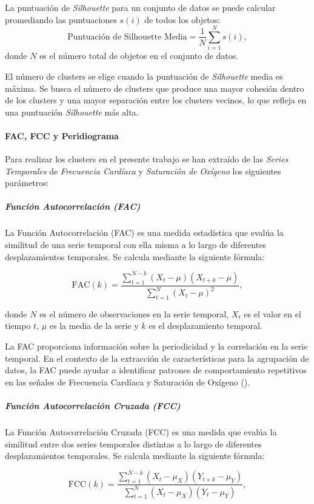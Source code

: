 La puntuación de \textit{Silhouette} para un conjunto de datos se puede calcular promediando las puntuaciones $s(i)$ de todos los objetos:
\[ \text{Puntuación de Silhouette Media} = \frac{1}{N} \sum_{i=1}^{N} s(i), \]
donde \(N\) es el número total de objetos en el conjunto de datos.

El número de clusters se elige cuando la puntuación de \textit{Silhouette} media es máxima. Se busca el número de clusters que produce una mayor cohesión dentro de los clusters y una mayor
separación entre los clusters vecinos, lo que refleja en una puntuación \textit{Silhouette} más alta.

\paragraph{FAC, FCC y Peridiograma}\label{sec:fac-fcc-peridiograma}

Para realizar los clusters en el presente trabajo se han extraído de las \textit{Series Temporales} de \textit{Frecuencia Cardíaca} y \textit{Saturación de Oxígeno} los siguientes parámetros:

\subparagraph{Función Autocorrelación (FAC)}

La Función Autocorrelación (FAC) es una medida estadística que evalúa la similitud de una serie temporal con ella misma a lo largo de diferentes desplazamientos temporales. Se calcula mediante la siguiente fórmula:

\[
\text{FAC}(k) = \frac{\sum_{t=1}^{N-k}(X_t - \mu)(X_{t+k} - \mu)}{\sum_{t=1}^{N}(X_t - \mu)^2}
,\]

donde $N$ es el número de observaciones en la serie temporal, $X_t$ es el valor en el tiempo $t$, $\mu$ es la media de la serie y $k$ es el desplazamiento temporal.

La FAC proporciona información sobre la periodicidad y la correlación en la serie temporal. En el contexto de la extracción de características para la agrupación de datos, la FAC puede ayudar a identificar patrones de comportamiento repetitivos en las señales de Frecuencia Cardíaca y Saturación de Oxígeno (\cite{shumway2017chapter1}).

\subparagraph{Función Autocorrelación Cruzada (FCC)}

La Función Autocorrelación Cruzada (FCC) es una medida que evalúa la similitud entre dos series temporales distintas a lo largo de diferentes desplazamientos temporales. Se calcula mediante la siguiente fórmula:

\[
\text{FCC}(k) = \frac{\sum_{t=1}^{N-k}(X_t - \mu_X)(Y_{t+k} - \mu_Y)}{\sum_{t=1}^{N}(X_t - \mu_X)(Y_t - \mu_Y)}
,\]

